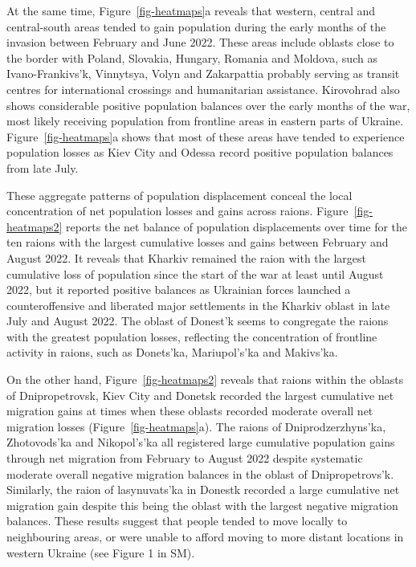 \documentclass[
  sn-nature,
  11pt,
]{sn-jnl}
\begin{document}
At the same time, Figure~\ref{fig-heatmaps}a reveals that western,
central and central-south areas tended to gain population during the
early months of the invasion between February and June 2022. These areas
include oblasts close to the border with Poland, Slovakia, Hungary,
Romania and Moldova, such as Ivano-Frankivs'k, Vinnytsya, Volyn and
Zakarpattia probably serving as transit centres for international
crossings and humanitarian assistance. Kirovohrad also shows
considerable positive population balances over the early months of the
war, most likely receiving population from frontline areas in eastern
parts of Ukraine. Figure~\ref{fig-heatmaps}a shows that most of these
areas have tended to experience population losses as Kiev City and
Odessa record positive population balances from late July.

These aggregate patterns of population displacement conceal the local
concentration of net population losses and gains across raions.
Figure~\ref{fig-heatmaps2} reports the net balance of population
displacements over time for the ten raions with the largest cumulative
losses and gains between February and August 2022. It reveals that
Kharkiv remained the raion with the largest cumulative loss of
population since the start of the war at least until August 2022, but it
reported positive balances as Ukrainian forces launched a
counteroffensive and liberated major settlements in the Kharkiv oblast
in late July and August 2022. The oblast of Donest'k seems to congregate
the raions with the greatest population losses, reflecting the
concentration of frontline activity in raions, such as Donets'ka,
Mariupol's'ka and Makivs'ka.

On the other hand, Figure~\ref{fig-heatmaps2} reveals that raions within
the oblasts of Dnipropetrovsk, Kiev City and Donetsk recorded the
largest cumulative net migration gains at times when these oblasts
recorded moderate overall net migration losses
(Figure~\ref{fig-heatmaps}a). The raions of Dniprodzerzhyns'ka,
Zhotovods'ka and Nikopol's'ka all registered large cumulative population
gains through net migration from February to August 2022 despite
systematic moderate overall negative migration balances in the oblast of
Dnipropetrovs'k. Similarly, the raion of lasynuvats'ka in Donestk
recorded a large cumulative net migration gain despite this being the
oblast with the largest negative migration balances. These results
suggest that people tended to move locally to neighbouring areas, or
were unable to afford moving to more distant locations in western
Ukraine (see Figure 1 in SM).
\end{document}
